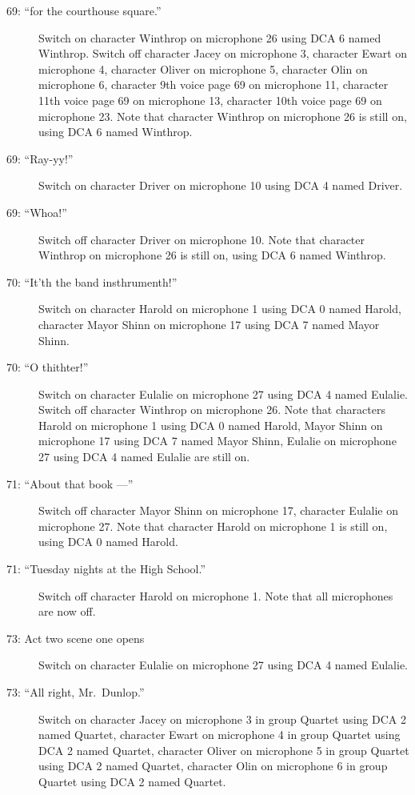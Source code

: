 \begin{description}
\item[69: ``for the courthouse square.'']
Switch on character Winthrop on microphone 26 using DCA 6 named Winthrop. Switch off character Jacey on microphone 3, character Ewart on microphone 4, character Oliver on microphone 5, character Olin on microphone 6, character 9th voice page 69 on microphone 11, character 11th voice page 69 on microphone 13, character 10th voice page 69 on microphone 23. Note that character Winthrop on microphone 26 is still on, using DCA 6 named Winthrop.

\item[69: ``Ray-yy!'']
Switch on character Driver on microphone 10 using DCA 4 named Driver. 

\item[69: ``Whoa!'']
Switch off character Driver on microphone 10. Note that character Winthrop on microphone 26 is still on, using DCA 6 named Winthrop.

\item[70: ``It'th the band insthrumenth!'']
Switch on character Harold on microphone 1 using DCA 0 named Harold, character Mayor Shinn on microphone 17 using DCA 7 named Mayor Shinn. 

\item[70: ``O thithter!'']
Switch on character Eulalie on microphone 27 using DCA 4 named Eulalie. Switch off character Winthrop on microphone 26. Note that characters Harold on microphone 1 using DCA 0 named Harold, Mayor Shinn on microphone 17 using DCA 7 named Mayor Shinn, Eulalie on microphone 27 using DCA 4 named Eulalie are still on.  

\item[71: ``About that book ---'']
Switch off character Mayor Shinn on microphone 17, character Eulalie on microphone 27. Note that character Harold on microphone 1 is still on, using DCA 0 named Harold.

\item[71: ``Tuesday nights at the High School.'']
Switch off character Harold on microphone 1. Note that all microphones are now off.

\item[73: Act two scene one opens]
Switch on character Eulalie on microphone 27 using DCA 4 named Eulalie. 

\item[73: ``All right, Mr.~Dunlop.'']
Switch on character Jacey on microphone 3 in group Quartet using DCA 2 named Quartet, character Ewart on microphone 4 in group Quartet using DCA 2 named Quartet, character Oliver on microphone 5 in group Quartet using DCA 2 named Quartet, character Olin on microphone 6 in group Quartet using DCA 2 named Quartet. 


\end{description}
